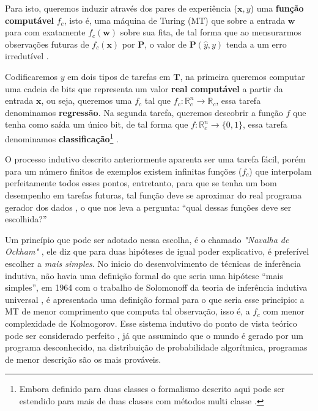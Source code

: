 Para isto, queremos induzir através dos pares de experiência
($\boldsymbol{x},y$) uma \textbf{função computável} $f_c$, isto é, uma máquina
de Turing (MT) que sobre a entrada $\boldsymbol{w}$ para com exatamente
$f_c(\boldsymbol{w})$ sobre sua fita, de tal forma que ao mensurarmos
observações futuras de $f_c(\boldsymbol{x})$ por $\boldsymbol P$, o valor de
$\boldsymbol{P}(\hat{y},y)$ tenda a um erro irredutível
\cite{mohri2018foundations,mitchell1997machine,friedman2001elements}.

Codificaremos $y$ em dois tipos de tarefas em $\boldsymbol{T}$, na primeira
queremos computar uma cadeia de bits que representa um valor \textbf{real
computável} a partir da entrada $\boldsymbol{x}$, ou seja, queremos uma $f_c$
tal que $f_c:\mathbb{R}_c^n\longrightarrow \mathbb{R}_c$, essa tarefa
denominamos \textbf{regressão}. Na segunda tarefa, queremos descobrir a função
$f$ que tenha como saída um único bit, de tal forma que
$f:\mathbb{R}_c^n\longrightarrow \{0,1\}$, essa tarefa denominamos
\textbf{classificação}\footnote{Embora definido para duas classes o formalismo
descrito aqui pode ser estendido para mais de duas classes com métodos
multi classe \cite{abu2012learning}.} \cite{goodfellow2016deep,
mohri2018foundations}.

O processo indutivo descrito anteriormente aparenta ser uma tarefa fácil, porém
para um número finitos de exemplos existem infinitas funções ($f_c$) que
interpolam perfeitamente todos esses
pontos\cite{bishop2006pattern,abu2012learning}, entretanto, para que se tenha
um bom desempenho em tarefas futuras, tal função deve se aproximar do real
programa gerador dos dados
\cite{mohri2018foundations,goodfellow2016deep,solomonoff1964formal,kearns1994introduction},
o que nos leva a pergunta: ``qual dessas funções deve ser escolhida?''

Um princípio que pode ser adotado nessa escolha, é o chamado \textit{"Navalha
de Ockham"} \cite{blumer1987occam}, ele diz que para duas hipóteses de igual
poder explicativo, é preferível escolher a \textit{mais simples}. No inicio do
desenvolvimento de técnicas de inferência indutiva, não havia uma definição
formal do que seria uma hipótese ``mais simples'', em 1964 com o trabalho de
Solomonoff da teoria de inferência indutiva universal
\cite{solomonoff1964formal}, é apresentada uma definição formal para o que
seria esse principio: a MT de menor comprimento que computa tal observação,
isso é, a $f_c$ com menor complexidade de Kolmogorov. Esse sistema indutivo do
ponto de vista teórico pode ser considerado perfeito \cite{li1992inductive}, já
que assumindo que o mundo é gerado por um programa desconhecido, na
distribuição de probabilidade algorítmica, programas de menor descrição são os
mais prováveis.

